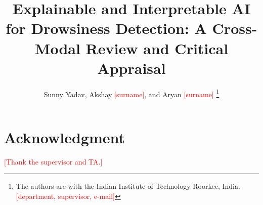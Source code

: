 \documentclass[journal]{IEEEtran}
\newcommand{\todo}[1]{\textcolor{red}{[#1]}}
\begin{document}
\title{Explainable and Interpretable AI for Drowsiness Detection: A Cross-Modal Review and Critical Appraisal}

\author{Sunny Yadav, Akshay \todo{surname}, and Aryan \todo{surname}%
\thanks{The authors are with the Indian Institute of Technology Roorkee, India. \todo{department, supervisor, e-mail}}}

\maketitle











\section*{Acknowledgment}
\todo{Thank the supervisor and TA.}



\end{document}

